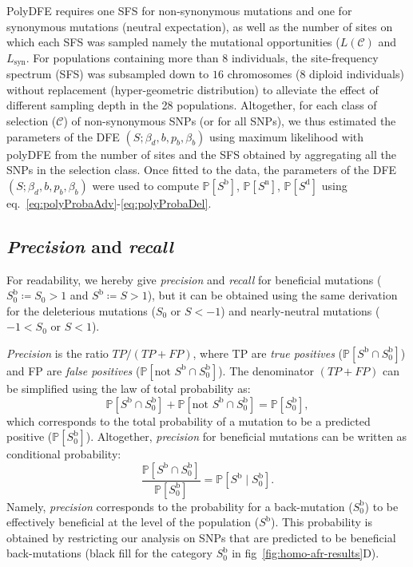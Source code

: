 \documentclass{article}
\newcommand{\proba}{\mathbb{P}}
\newcommand{\Sphy}{S_{0}}
\newcommand{\Sphyclass}{\mathcal{C}}
\newcommand{\given}{\mid}
\newcommand{\Spop}{S}
\newcommand{\PpolyDel}{\proba [ \Spop^{\text{d}}]}
\newcommand{\PpolyNeutral}{\proba [ \Spop^{\text{n}} ]}
\newcommand{\PpolyAdv}{\proba [ \Spop^{\text{b}} ]}
\newcommand{\AdvMean}{\beta_b}
\newcommand{\DelMean}{\beta_d}
\begin{document}
    PolyDFE requires one SFS for non-synonymous mutations and one for synonymous mutations (neutral expectation), as well as the number of sites on which each SFS was sampled namely the mutational opportunities ($L(\Sphyclass)$ and $L_{\text{syn}}$.
    For populations containing more than $8$ individuals, the site-frequency spectrum (SFS) was subsampled down to $16$ chromosomes ($8$ diploid individuals) without replacement (hyper-geometric distribution) to alleviate the effect of different sampling depth in the 28 populations.
    Altogether, for each class of selection ($\Sphyclass$) of non-synonymous SNPs (or for all SNPs), we thus estimated the parameters of the DFE $\left( \Spop; \DelMean , b, p_b, \AdvMean \right)$ using maximum likelihood with polyDFE from the number of sites and the SFS obtained by aggregating all the SNPs in the selection class.
    Once fitted to the data, the parameters of the DFE $\left( \Spop; \DelMean , b, p_b, \AdvMean \right)$ were used to compute $\PpolyAdv$, $\PpolyNeutral$, $\PpolyDel$ using eq.~\ref{eq:polyProbaAdv}-\ref{eq:polyProbaDel}.

    \subsection{\textit{Precision} and \textit{recall}}
    \label{subsec:precisison_recall}
    For readability, we hereby give \textit{precision} and \textit{recall} for beneficial mutations ($\Sphy^{\text{b}} \coloneqq \Sphy > 1$ and $\Spop^{\text{b}} \coloneqq \Spop > 1$), but it can be obtained using the same derivation for the deleterious mutations ($\Sphy \text{ or } \Spop < -1$) and nearly-neutral mutations ($-1 < \Sphy \text{ or } \Spop < 1$).

    \textit{Precision} is the ratio $TP / (TP + FP)$, where TP are \textit{true positives} ($\proba [ \Spop^{\text{b}} \cap  \Sphy^{\text{b}}]$) and FP are \textit{false positives} ($\proba [ \text{not } \Spop^{\text{b}} \cap \Sphy^{\text{b}}]$).
    The denominator $(TP + FP)$ can be simplified using the law of total probability as:
    \begin{equation}
        \proba [ \Spop^{\text{b}} \cap \Sphy^{\text{b}}] + \proba [\text{not } \Spop^{\text{b}} \cap \Sphy^{\text{b}}] = \proba [ \Sphy^{\text{b}}],
    \end{equation}
    which corresponds to the total probability of a mutation to be a predicted positive ($\proba [ \Sphy^{\text{b}}]$).
    Altogether, \textit{precision} for beneficial mutations can be written as conditional probability:
    \begin{equation}
        \frac{\proba [ \Spop^{\text{b}}  \cap  \Sphy^{\text{b}}]}{\proba [ \Sphy^{\text{b}}]} = \proba [ \Spop^{\text{b}}  \given  \Sphy^{\text{b}}].
    \end{equation}
    Namely, \textit{precision} corresponds to the probability for a back-mutation ($\Sphy^{\text{b}}$) to be effectively beneficial at the level of the population ($\Spop^{\text{b}}$).
    This probability is obtained by restricting our analysis on SNPs that are predicted to be beneficial back-mutations (black fill for the category $\Sphy^{\text{b}}$ in fig~\ref{fig:homo-afr-results}D).
\end{document}
